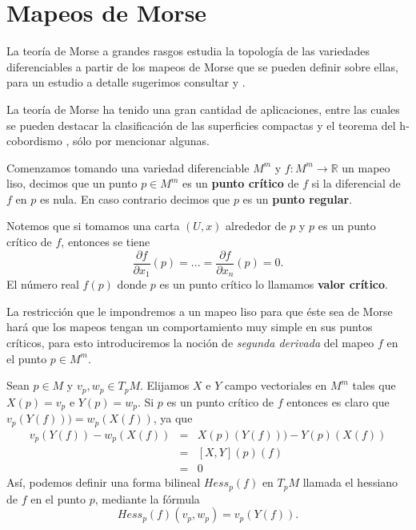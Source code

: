 \documentclass[a4paper,10pt]{book}
\begin{document}
\section{Mapeos de Morse}\label{1.2}
La teor\'ia de Morse a grandes rasgos estudia la topolog\'ia de las variedades diferenciables a partir de los mapeos de Morse que se pueden definir sobre ellas, para un estudio a detalle sugerimos consultar \cite{Milnor} y \cite{Matsumoto}. 
\vspace{5mm}

La teor\'ia de Morse ha tenido una gran cantidad de aplicaciones, entre las cuales se pueden destacar la clasificaci\'on de las superficies compactas \cite{Xu} y el teorema del h-cobordismo \cite{MilnorH-C}, s\'olo por mencionar algunas.
\vspace{5mm} 

Comenzamos tomando una variedad diferenciable  $M^{m}$ y $f:M^{m}\to\mathbb{R}$ un mapeo liso, decimos que un punto $p\in M^{m}$ es un {\bfseries punto cr\'itico} de $f$ si la diferencial de $f$ en $p$ es nula. En caso contrario decimos que $p$ es un {\bfseries punto regular}.
\vspace{5mm}

Notemos que si tomamos una carta $(U,x)$ alrededor de $p$ y $p$ es un punto cr\'itico de $f$, entonces se tiene    
$$\frac{\partial f}{\partial x_{1}}(p)=...=\frac{\partial f}{\partial x_{n}}(p)=0.$$   
El n\'umero real $f(p)$ donde $p$ es un punto cr\'itico lo llamamos {\bfseries valor cr\'itico}.
\vspace{5mm}

La restricci\'on que le impondremos a un mapeo liso para que \'este sea de Morse har\'a que los mapeos tengan un comportamiento muy simple en sus puntos cr\'iticos, para esto introduciremos la noci\'on de \emph{segunda derivada} del mapeo $f$ en el punto $p\in M^{m}$.
\vspace{5mm}

Sean $p\in M$ y $v_{p},w_{p}\in T_{p}M$. Elijamos $X$ e $Y$ campo vectoriales en $M^{m}$ tales que $X(p)=v_{p}$ e $Y(p)=w_{p}$. Si $p$ es un punto cr\'itico de $f$ entonces es claro que $v_{p}(Y(f)))=w_{p}(X(f))$, ya que
\[ \begin{array}{ccl}
	v_{p}(Y(f))-w_{p}(X(f)) & = & X(p)(Y(f)))-Y(p)(X(f))\\
							 & = & [X,Y](p)(f) \\
							 & = & 0 
\end{array} \]
As\'i, podemos definir una forma bilineal $Hess_{p}(f)$ en $T_{p}M$ llamada el hessiano de $f$ en el punto $p$, mediante la f\'ormula
$$Hess_{p}(f)(v_{p},w_{p}) = v_{p}(Y(f)).$$  
\vspace{5mm}
\end{document}
